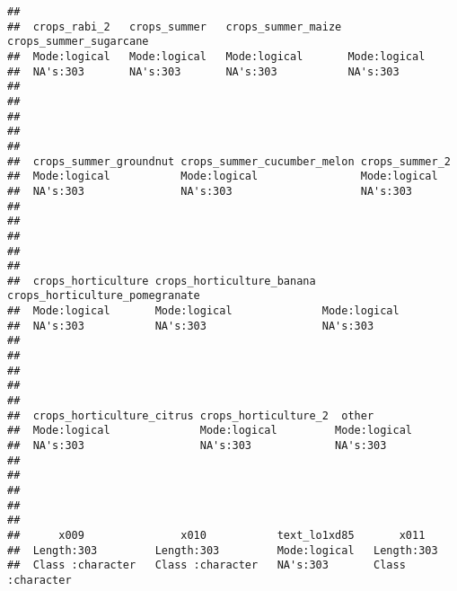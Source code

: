 \documentclass[
]{article}
\begin{document}
\begin{verbatim}
##                                                                       
##  crops_rabi_2   crops_summer   crops_summer_maize crops_summer_sugarcane
##  Mode:logical   Mode:logical   Mode:logical       Mode:logical          
##  NA's:303       NA's:303       NA's:303           NA's:303              
##                                                                         
##                                                                         
##                                                                         
##                                                                         
##                                                                         
##  crops_summer_groundnut crops_summer_cucumber_melon crops_summer_2
##  Mode:logical           Mode:logical                Mode:logical  
##  NA's:303               NA's:303                    NA's:303      
##                                                                   
##                                                                   
##                                                                   
##                                                                   
##                                                                   
##  crops_horticulture crops_horticulture_banana crops_horticulture_pomegranate
##  Mode:logical       Mode:logical              Mode:logical                  
##  NA's:303           NA's:303                  NA's:303                      
##                                                                             
##                                                                             
##                                                                             
##                                                                             
##                                                                             
##  crops_horticulture_citrus crops_horticulture_2  other        
##  Mode:logical              Mode:logical         Mode:logical  
##  NA's:303                  NA's:303             NA's:303      
##                                                               
##                                                               
##                                                               
##                                                               
##                                                               
##      x009               x010           text_lo1xd85       x011          
##  Length:303         Length:303         Mode:logical   Length:303        
##  Class :character   Class :character   NA's:303       Class :character  

\end{verbatim}
\end{document}
